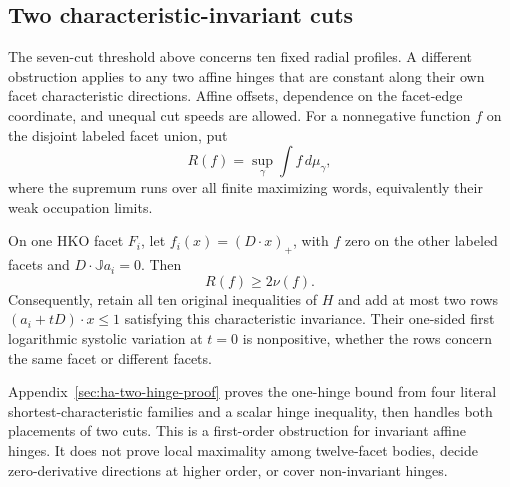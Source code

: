 \subsection{Two characteristic-invariant cuts}
\label{subsec:ha-two-hinge}

The seven-cut threshold above concerns ten fixed radial profiles. A
different obstruction applies to any two affine hinges that are
constant along their own facet characteristic directions. Affine
offsets, dependence on the facet-edge coordinate, and unequal cut
speeds are allowed. For a nonnegative function $f$ on the disjoint
labeled facet union, put
\[
 R(f)=\sup_\gamma\int f\,d\mu_\gamma,
\]
where the supremum runs over all finite maximizing words, equivalently
their weak occupation limits.

\begin{proposition}\label{prop:ha-two-hinge}
On one HKO facet $F_i$, let $f_i(x)=(D\cdot x)_+$, with $f$ zero on the
other labeled facets and $D\cdot\mathbb{J}a_i=0$. Then
\begin{equation}\label{eq:ha-amplification}
 R(f)\geq2\nu(f).
\end{equation}
Consequently, retain all ten original inequalities of $H$ and add at
most two rows $(a_i+tD)\cdot x\leq1$ satisfying this characteristic
invariance. Their one-sided first logarithmic systolic variation at
$t=0$ is nonpositive, whether the rows concern the same facet or
different facets.
\end{proposition}

Appendix~\ref{sec:ha-two-hinge-proof} proves the one-hinge bound from
four literal shortest-characteristic families and a scalar hinge
inequality, then handles both placements of two cuts. This is a
first-order obstruction for invariant affine hinges. It does not prove
local maximality among twelve-facet bodies, decide zero-derivative
directions at higher order, or cover non-invariant hinges.
